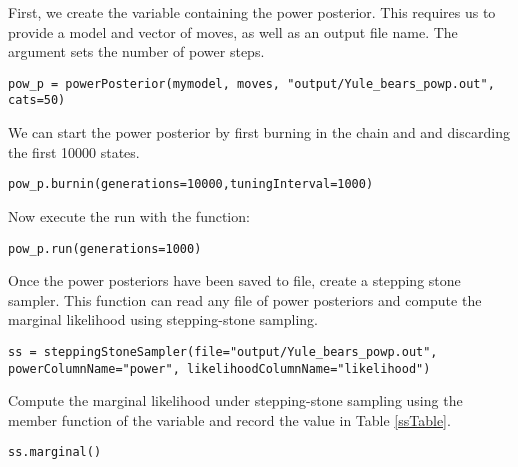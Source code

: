 
First, we create the variable containing the power posterior. This requires us to provide a model and vector of moves, as well as an output file name. The  argument sets the number of power steps.
{\tt \begin{snugshade*}
\begin{lstlisting}
pow_p = powerPosterior(mymodel, moves, "output/Yule_bears_powp.out", cats=50) 
\end{lstlisting}
\end{snugshade*}}

We can start the power posterior by first burning in the chain and and discarding the first 10000 states.  
{\tt \begin{snugshade*}
\begin{lstlisting}
pow_p.burnin(generations=10000,tuningInterval=1000)
\end{lstlisting}
\end{snugshade*}}

Now execute the run with the  function:
{\tt \begin{snugshade*}
\begin{lstlisting}
pow_p.run(generations=1000)  
\end{lstlisting}
\end{snugshade*}}

Once the power posteriors have been saved to file, create a stepping stone sampler. This function can read any file of power posteriors and compute the marginal likelihood using stepping-stone sampling. 
{\tt \small \begin{snugshade*}
\begin{lstlisting}
ss = steppingStoneSampler(file="output/Yule_bears_powp.out", powerColumnName="power", likelihoodColumnName="likelihood")
\end{lstlisting}
\end{snugshade*}}

Compute the marginal likelihood under stepping-stone sampling using the member function  of the  variable and record the value in Table \ref{ssTable}.
{\tt \begin{snugshade*}
\begin{lstlisting}
ss.marginal() 
\end{lstlisting}
\end{snugshade*}}

